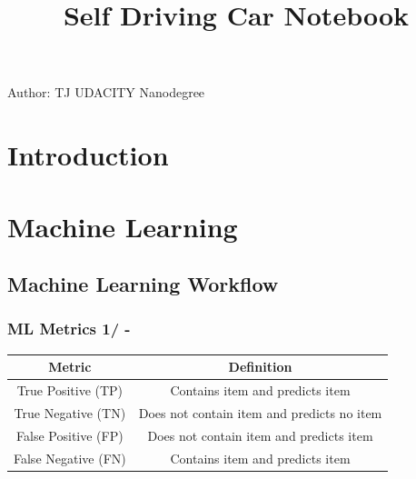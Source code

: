 \documentclass[11pt,xcolor={dvipsnames},usepdftitle=false]{beamer}
\begin{document}
\title{Self Driving Car Notebook}

\information%
%
%
{Author: TJ}
%
{UDACITY Nanodegree}

\maketitle
\tableofcontents

\section{Introduction}


\begin{frame}
  \frametitle{}


\end{frame}

\section{Machine Learning}

\subsection{Machine Learning Workflow}

\begin{frame}
  \frametitle{ML Metrics 1/ - }
  \begin{table}
    \begin{tabular}{| c | c |}
      \hline
      \small {\textbf{Metric}} & {\textbf{Definition}}  \\\hline
      \small True Positive (TP)   & Contains item and predicts item   \\\hline
      \small True Negative (TN)   & Does not contain item and predicts no item   \\\hline
      \small False Positive (FP)  & Does not contain item and predicts item   \\\hline
      \small False Negative (FN)  & Contains item and predicts item   \\\hline
    \end{tabular}
  \end{table}

\end{frame}
\end{document}
